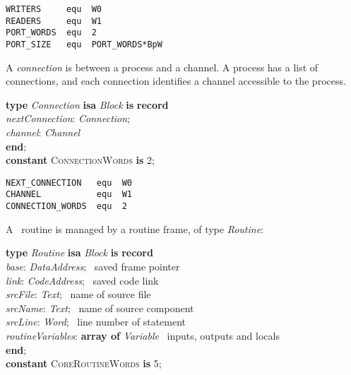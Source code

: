 {\small
\begin{verbatim}
WRITERS     equ  W0
READERS     equ  W1
PORT_WORDS  equ  2
PORT_SIZE   equ  PORT_WORDS*BpW
\end{verbatim}}


A \emph{connection} is between a process and a channel. A process has a list of connections, and each connection identifies a channel accessible to the process.

\begin{tabbing}
\indents
\vb\>\textbf{type} \emph{Connection} \textbf{isa} \emph{Block} \textbf{is} \textbf{record}\\
\vb\>\>\emph{nextConnection}: \emph{Connection};\\
\vb\>\>\emph{channel}: \emph{Channel}\\
\vb\>\textbf{end};\\
\vb\>\textbf{constant} \textsc{ConnectionWords} \textbf{is} 2;
\end{tabbing}

{\small
\begin{verbatim}
NEXT_CONNECTION   equ  W0
CHANNEL           equ  W1
CONNECTION_WORDS  equ  2
\end{verbatim}}


A \desi\ routine is managed by a routine frame, of type \emph{Routine}:

\begin{tabbing}
\indents
\vb\>\textbf{type} \emph{Routine} \textbf{isa} \emph{Block} \textbf{is} \textbf{record}\\
\vb\>\>\emph{base}: \emph{DataAddress};
   \>\>\>\>\>\>\>\>\>\> \rmk\ saved frame pointer\\
\vb\>\>\emph{link}: \emph{CodeAddress};
   \>\>\>\>\>\>\>\>\>\> \rmk\ saved code link\\
\vb\>\>\emph{srcFile}: \emph{Text};
   \>\>\>\>\>\>\>\>\>\> \rmk\ name of source file\\
\vb\>\>\emph{srcName}: \emph{Text};
   \>\>\>\>\>\>\>\>\>\> \rmk\ name of source component\\
\vb\>\>\emph{srcLine}: \emph{Word};
   \>\>\>\>\>\>\>\>\>\> \rmk\ line number of statement\\
\vb\>\>\emph{routineVariables}: \textbf{array of} \emph{Variable}
   \>\>\>\>\>\>\>\>\>\> \rmk\ inputs, outputs and locals\\
\vb\>\textbf{end};\\
\vb\>\textbf{constant} \textsc{CoreRoutineWords} \textbf{is} 5;
\end{tabbing}

